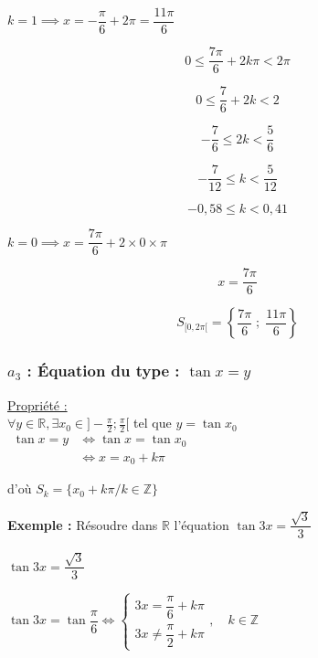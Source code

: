 \documentclass[12pt,a4paper]{article}
\begin{document}
\noindent $k = 1 \implies x = -\dfrac{\pi}{6} + 2\pi = \dfrac{11\pi}{6}$

\[
0 \le \frac{7\pi}{6} + 2k\pi < 2\pi
\]

\[
0 \le \frac{7}{6} + 2k < 2
\]

\[
-\frac{7}{6} \le 2k < \frac{5}{6}
\]

\[
-\frac{7}{12} \le k < \frac{5}{12}
\]

\[
-0{,}58 \le k < 0{,}41
\]

\vspace{0.2cm}

\noindent $k = 0 \implies x = \dfrac{7\pi}{6} + 2 \times 0 \times \pi$

\[
x = \frac{7\pi}{6}
\]

\vspace{0.3cm}

\[
S_{[0, 2\pi[} = \left\{ \frac{7\pi}{6} \;;\; \frac{11\pi}{6} \right\}
\]

\subsubsection*{\textbf{ $a_3$ : Équation du type : $\tan x = y$ }}

\underline{Propriété :} \\
$\forall y \in \mathbb{R}, \exists x_0 \in ]-\frac{\pi}{2}; \frac{\pi}{2}[$ tel que $y = \tan x_0$ \\

$
\begin{aligned} 
\tan x = y &\iff \tan x = \tan x_0\\
            &\iff x = x_0 + k\pi
\end{aligned}
$

d'où $\boxed{S_k = \{x_0 + k\pi / k \in \mathbb{Z}\}}$

\vspace{1cm}

\noindent \textbf{Exemple :} Résoudre dans $\mathbb{R}$ l'équation $\tan 3x = \dfrac{\sqrt{3}}{3}$

\vspace{0.3cm}

\noindent $\tan 3x = \dfrac{\sqrt{3}}{3}$

\vspace{0.2cm}

\noindent $\tan 3x = \tan \dfrac{\pi}{6} \iff \begin{cases} 3x = \dfrac{\pi}{6} + k\pi \\[4mm] 3x \neq \dfrac{\pi}{2} + k\pi \end{cases} , \quad k \in \mathbb{Z}$
\end{document}
